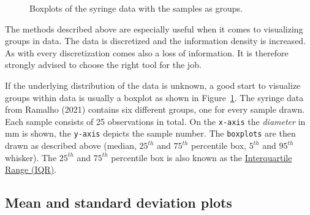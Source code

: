 \documentclass[
  a4paper,
]{scrbook}
\begin{document}
\begin{figure}[ht]


\caption{\label{fig-groups-boxplot}Boxplots of the syringe data with the
samples as groups.}

\end{figure}%

The methods described above are especially useful when it comes to
visualizing groups in data. The data is discretized and the information
density is increased. As with every discretization comes also a loss of
information. It is therefore strongly advised to choose the right tool
for the job.

If the underlying distribution of the data is unknown, a good start to
visualize groups within data is usually a boxplot as shown in
Figure~\ref{fig-groups-boxplot}. The syringe data from Ramalho (2021)
contains six different groups, one for every sample drawn. Each sample
consists of 25 observations in total. On the \texttt{x-axis} the
\emph{diameter} in mm is shown, the \texttt{y-axis} depicts the sample
number. The \texttt{boxplots} are then drawn as described above (median,
\(25^{th}\) and \(75^{th}\) percentile box, \(5^{th}\) and \(95^{th}\)
whisker). The \(25^{th}\) and \(75^{th}\) percentile box is also known
as the \hyperref[acronyms_IQR]{Interquartile Range (IQR)}.

\subsection{Mean and standard deviation
plots}\label{mean-and-standard-deviation-plots}
\end{document}
